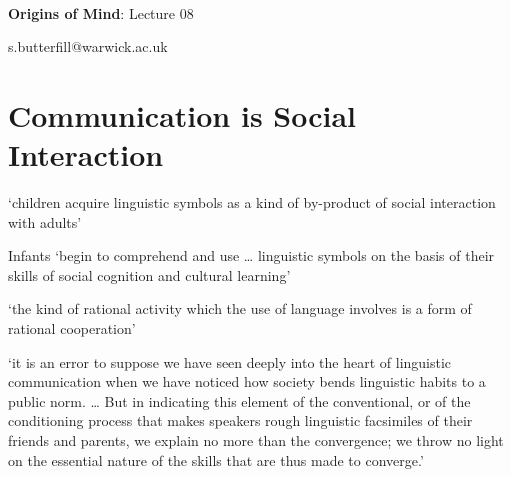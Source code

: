 \documentclass[12pt]{extarticle}
\date{}
\makeatletter
\def \ititle {Origins of Mind}
\def \isubtitle {Lecture 08}
\def \iemail{s.butterfill@warwick.ac.uk}
\makeatother
\begin{document}
\begin{multicols}{3}

\setlength\footnotesep{1em}









\def \ititle {Origins of Mind}
 
\def \isubtitle {Lecture 08}
 
 
 
\
 
 
 
\begin{center}
 
{\Large
 
\textbf{\ititle}: \isubtitle
 
}
 
 
 
\iemail %
 
\end{center}
 
 
 
\section{Communication is Social Interaction}
 
‘children acquire linguistic symbols as a kind of by-product of social interaction with adults’
\citep[p.\ 90]{Tomasello:2003fk}
 
Infants ‘begin to comprehend and use … linguistic symbols on the basis of their skills of 
social cognition and cultural learning’ \citep[p.\ 582]{Tomasello:1999en}
 
‘the kind of rational activity which the use of language involves is a form of rational cooperation’
\citep[p.\ 341]{Grice:1989ha}
 
‘it is an error to suppose we have seen deeply into the heart of linguistic communication when we have noticed how society bends linguistic habits to a public norm.
…  But in indicating this element of the conventional, or of the conditioning process that makes speakers rough linguistic facsimiles of their friends and parents, we explain no more than the convergence; we throw no light on the essential nature of the skills that are thus made to converge.’
\citep[p.\ 278]{Davidson:1982uu}
 

\end{multicols}
\end{document}

